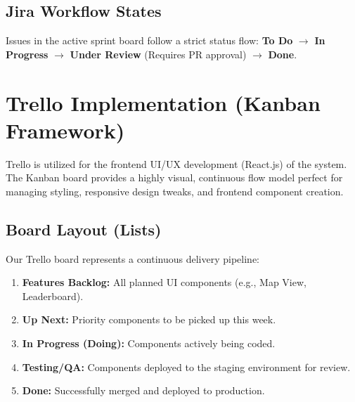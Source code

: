 \documentclass[12pt,a4paper]{article}
\begin{document}
\subsection{Jira Workflow States}
Issues in the active sprint board follow a strict status flow:
\textbf{To Do} $\rightarrow$ \textbf{In Progress} $\rightarrow$ \textbf{Under Review} (Requires PR approval) $\rightarrow$ \textbf{Done}.

\vspace{1cm}
\begin{center}
\end{center}
\vspace{1cm}

\section{Trello Implementation (Kanban Framework)}
Trello is utilized for the frontend UI/UX development (React.js) of the system. The Kanban board provides a highly visual, continuous flow model perfect for managing styling, responsive design tweaks, and frontend component creation.

\subsection{Board Layout (Lists)}
Our Trello board represents a continuous delivery pipeline:
\begin{enumerate}
    \item \textbf{Features Backlog:} All planned UI components (e.g., Map View, Leaderboard).
    \item \textbf{Up Next:} Priority components to be picked up this week.
    \item \textbf{In Progress (Doing):} Components actively being coded.
    \item \textbf{Testing/QA:} Components deployed to the staging environment for review.
    \item \textbf{Done:} Successfully merged and deployed to production.
\end{enumerate}
\end{document}
